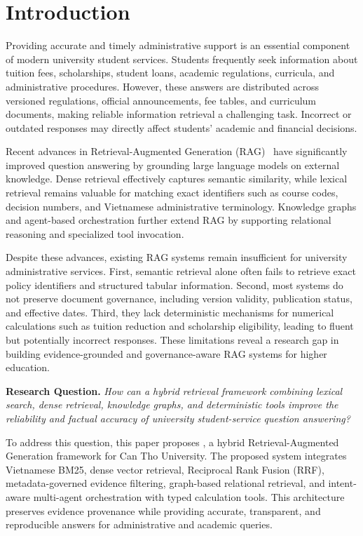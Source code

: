 \section{Introduction}
\label{sec:intro}

Providing accurate and timely administrative support is an essential component of modern university student services. Students frequently seek information about tuition fees, scholarships, student loans, academic regulations, curricula, and administrative procedures. However, these answers are distributed across versioned regulations, official announcements, fee tables, and curriculum documents, making reliable information retrieval a challenging task. Incorrect or outdated responses may directly affect students' academic and financial decisions.

Recent advances in Retrieval-Augmented Generation (RAG)~\cite{lewis2020rag} have significantly improved question answering by grounding large language models on external knowledge. Dense retrieval effectively captures semantic similarity, while lexical retrieval remains valuable for matching exact identifiers such as course codes, decision numbers, and Vietnamese administrative terminology. Knowledge graphs and agent-based orchestration further extend RAG by supporting relational reasoning and specialized tool invocation.

Despite these advances, existing RAG systems remain insufficient for university administrative services. First, semantic retrieval alone often fails to retrieve exact policy identifiers and structured tabular information. Second, most systems do not preserve document governance, including version validity, publication status, and effective dates. Third, they lack deterministic mechanisms for numerical calculations such as tuition reduction and scholarship eligibility, leading to fluent but potentially incorrect responses. These limitations reveal a research gap in building evidence-grounded and governance-aware RAG systems for higher education.

\textbf{Research Question.} \textit{How can a hybrid retrieval framework combining lexical search, dense retrieval, knowledge graphs, and deterministic tools improve the reliability and factual accuracy of university student-service question answering?}

To address this question, this paper proposes \textbf{\system{}}, a hybrid Retrieval-Augmented Generation framework for Can Tho University. The proposed system integrates Vietnamese BM25, dense vector retrieval, Reciprocal Rank Fusion (RRF), metadata-governed evidence filtering, graph-based relational retrieval, and intent-aware multi-agent orchestration with typed calculation tools. This architecture preserves evidence provenance while providing accurate, transparent, and reproducible answers for administrative and academic queries.

